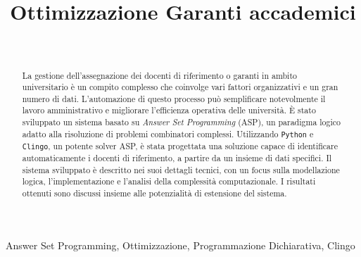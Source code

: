 \documentclass[journal]{IEEEtran}
\begin{document}
\title{Ottimizzazione Garanti accademici}

\author{
\\

}

\maketitle

\begin{abstract} 
	La gestione dell'assegnazione dei docenti di riferimento o
	garanti in ambito universitario è un compito complesso che coinvolge vari
	fattori organizzativi e un gran numero di dati. L'automazione di questo
	processo può semplificare notevolmente il lavoro amministrativo e migliorare
	l'efficienza operativa delle università. È stato sviluppato un sistema basato
	su \textit{Answer Set Programming} (ASP), un paradigma logico adatto alla
	risoluzione di problemi combinatori complessi. Utilizzando \texttt{Python} e
	\texttt{Clingo}, un potente solver ASP,  è stata progettata una soluzione
	capace di identificare automaticamente i docenti di riferimento, a partire da
	un insieme di dati specifici. Il sistema sviluppato è descritto nei suoi
	dettagli tecnici, con un focus sulla modellazione logica, l'implementazione e
	l'analisi della complessità computazionale. I risultati ottenuti sono discussi
	insieme alle potenzialità di estensione del sistema.
\end{abstract}

\begin{IEEEkeywords}
Answer Set Programming, Ottimizzazione, Programmazione Dichiarativa, Clingo
\end{IEEEkeywords}











\end{document}
